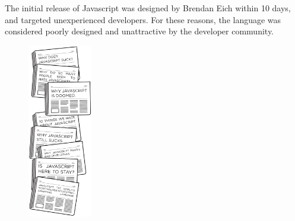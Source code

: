 
The initial release of Javascript was designed by Brendan Eich within 10 days, and targeted unexperienced developers.
For these reasons, the language was considered poorly designed and unattractive by the developer community.




\begin{figure}
  \vspace{-20pt}
  \begin{center}
    \includegraphics[width=0.25\textwidth]{../resources/javascript-hate.pdf}
  \end{center}
  \vspace{-35pt}
\end{figure}

